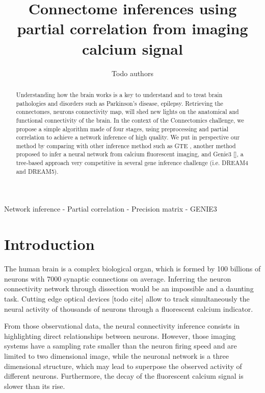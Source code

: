\documentclass[wcp]{jmlr}
\title{Connectome inferences using partial correlation from imaging calcium signal}
\author{Todo authors}
\begin{document}
\maketitle


\begin{abstract} Understanding how the brain works is a key to understand and
to treat brain pathologies and disorders such as Parkinson's disease,
epilepsy. Retrieving the connectomes, neurons connectivity map, will shed new
lights on the anatomical and functional connectivity of the brain. In the
context of the Connectomics challenge, we propose a simple  algorithm made of
four stages, using preprocessing and partial correlation to achieve a network
inference of high quality. We put in perspective our method by comparing
with other inference method such as GTE \cite{stetter2012model}, another
method proposed to infer a neural network from calcium fluorescent imaging,
and Genie3 [], a tree-based approach very competitive in several gene
inference challenge (i.e. DREAM4 and DREAM5).


\end{abstract}

\begin{keywords}
Network inference - Partial correlation - Precision matrix - GENIE3
\end{keywords}


\section{Introduction}\label{sec:intro}

The human brain is a complex biological organ, which is formed by 100
billions of neurons with 7000 synaptic connections on average. Inferring the
neuron connectivity network through dissection would be an impossible
and a daunting task. Cutting edge optical devices [todo cite] allow to track
simultaneously the neural activity of thousands of neurons through a fluorescent
calcium indicator.

From those observational data, the neural connectivity inference consists in
highlighting direct relationships between neurons. However, those imaging
systems have a sampling rate smaller than the neuron firing speed and are
limited to two dimensional image, while the neuronal network is a
three dimensional structure, which may lead to superpose the observed activity
of different neurons. Furthermore, the decay of the fluorescent calcium signal
is slower than its rise.
\end{document}
